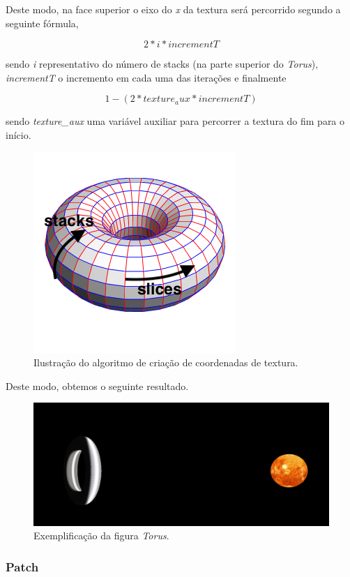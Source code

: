 \documentclass[a4paper]{article}
\begin{document}
Deste modo, na face superior o eixo do \textit{x} da textura será percorrido segundo a seguinte fórmula,

\[ 2 * i * incrementT \]

sendo \textit{i} representativo do número de stacks (na parte superior do \textit{Torus}), \textit{incrementT} o incremento em cada uma das iterações e finalmente

\[ 1 - (2 * texture_aux * incrementT) \]

sendo \textit{texture\_aux} uma variável auxiliar para percorrer a textura do fim para o início.

\begin{figure}[!h]
    \centering
    \includegraphics[width=0.5\linewidth]{torus1.png}
    \caption{Ilustração do algoritmo de criação de coordenadas de textura.}
    \label{fig:ref_torus1}
\end{figure}

Deste modo, obtemos o seguinte resultado.

\begin{figure}[!h]
    \centering
    \includegraphics[width=0.5\linewidth]{exemplo_torus.png}
    \caption{Exemplificação da figura \textit{Torus}.}
    \label{fig:ref_ex_torus}
\end{figure}

\subsubsection{Patch}


\end{document}
